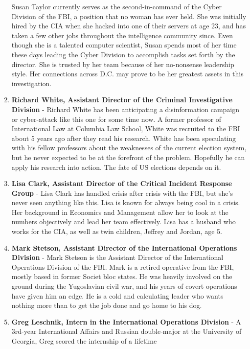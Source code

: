 \documentclass[10pt, letterpaper]{article}
\begin{document}
\begin{enumerate}
  Susan Taylor currently serves as the second-in-command of the Cyber
  Division of the FBI, a position that no woman has ever held. She was
  initially hired by the CIA when she hacked into one of their servers
  at age 23, and has taken a few other jobs throughout the intelligence
  community since. Even though she is a talented computer scientist,
  Susan spends most of her time these days leading the Cyber Division to
  accomplish tasks set forth by the director. She is trusted by her team
  because of her no-nonsense leadership style. Her connections across
  D.C. may prove to be her greatest assets in this investigation.
\item
  \textbf{Richard White, Assistant Director of the Criminal
  Investigative Division} - Richard White has been anticipating a
  disinformation campaign or cyber-attack like this one for some time
  now. A former professor of International Law at Columbia Law School,
  White was recruited to the FBI about 5 years ago after they read his
  research. White has been speculating with his fellow professors about
  the weaknesses of the current election system, but he never expected
  to be at the forefront of the problem. Hopefully he can apply his
  research into action. The fate of US elections depends on it.
\item
  \textbf{Lisa Clark, Assistant Director of the Critical Incident
  Response Group} - Lisa Clark has handled crisis after crisis with the
  FBI, but she's never seen anything like this. Lisa is known for always
  being cool in a crisis. Her background in Economics and Management
  allow her to look at the numbers objectively and lead her team
  effectively. Lisa has a husband who works for the CIA, as well as twin
  children, Jeffrey and Jordan, age 5.
\item
  \textbf{Mark Stetson, Assistant Director of the International
  Operations Division} - Mark Stetson is the Assistant Director of the
  International Operations Division of the FBI. Mark is a retired
  operative from the FBI, mostly based in former Societ bloc states. He
  was heavily involved on the ground during the Yugoslavian civil war,
  and his years of covert operations have given him an edge. He is a
  cold and calculating leader who wants nothing more than to get the job
  done and go home to his dog.
\item
  \textbf{Greg Leschnik, Intern in the International Operations
  Division} - A 3rd-year International Affairs and Russian double-major
  at the University of Georgia, Greg scored the internship of a lifetime

\end{enumerate}
\end{document}
